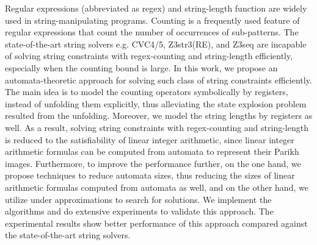 \documentclass{standalone}
\begin{document}
Regular expressions (abbreviated as regex) and string-length function are widely used in string-manipulating programs. 
Counting is a frequently used feature of regular expressions that count the number of occurrences of sub-patterns. The state-of-the-art string solvers e.g. CVC4/5, Z3str3(RE), and Z3seq are incapable of solving string constraints with regex-counting and string-length efficiently, especially when the counting bound is large. In this work, we propose an automata-theoretic approach for solving such class of string constraints efficiently. 
%
The main idea is to model the counting operators symbolically by registers, instead of unfolding them explicitly, thus alleviating the state explosion problem resulted from the unfolding.  
%
Moreover, we model the string lengths by registers as well. As a result, solving string constraints with regex-counting and string-length is reduced to the satisfiability of linear integer arithmetic, since linear integer arithmetic formulas can be computed from automata to represent their Parikh images. 
%
%
Furthermore, to improve the performance further, on the one hand, we propose techniques to reduce automata sizes, thus reducing the sizes of linear arithmetic formulas computed from automata as well, and on the other hand, we utilize under approximations to search for solutions.   
We implement the algorithms and do extensive experiments to validate this approach. The experimental results show better performance of this approach compared against the state-of-the-art string solvers.



\end{document}
